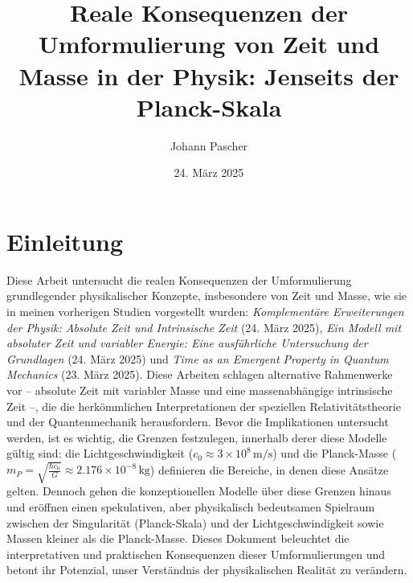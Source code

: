 \documentclass[a4paper,12pt]{article}
\begin{document}
	
	\title{Reale Konsequenzen der Umformulierung von Zeit und Masse in der Physik: Jenseits der Planck-Skala}
	\author{Johann Pascher}
	\date{24. März 2025}
	\maketitle
	
	\tableofcontents %
	\newpage %
	
	\section{Einleitung}
	Diese Arbeit untersucht die realen Konsequenzen der Umformulierung grundlegender physikalischer Konzepte, insbesondere von Zeit und Masse, wie sie in meinen vorherigen Studien vorgestellt wurden: \textit{Komplementäre Erweiterungen der Physik: Absolute Zeit und Intrinsische Zeit} (24. März 2025), \textit{Ein Modell mit absoluter Zeit und variabler Energie: Eine ausführliche Untersuchung der Grundlagen} (24. März 2025) und \textit{Time as an Emergent Property in Quantum Mechanics} (23. März 2025). Diese Arbeiten schlagen alternative Rahmenwerke vor – absolute Zeit mit variabler Masse und eine massenabhängige intrinsische Zeit –, die die herkömmlichen Interpretationen der speziellen Relativitätstheorie und der Quantenmechanik herausfordern. Bevor die Implikationen untersucht werden, ist es wichtig, die Grenzen festzulegen, innerhalb derer diese Modelle gültig sind: die Lichtgeschwindigkeit (\( c_0 \approx 3 \times 10^8 \, \text{m/s} \)) und die Planck-Masse (\( m_P = \sqrt{\frac{\hbar c_0}{G}} \approx 2.176 \times 10^{-8} \, \text{kg} \)) definieren die Bereiche, in denen diese Ansätze gelten. Dennoch gehen die konzeptionellen Modelle über diese Grenzen hinaus und eröffnen einen spekulativen, aber physikalisch bedeutsamen Spielraum zwischen der Singularität (Planck-Skala) und der Lichtgeschwindigkeit sowie Massen kleiner als die Planck-Masse. Dieses Dokument beleuchtet die interpretativen und praktischen Konsequenzen dieser Umformulierungen und betont ihr Potenzial, unser Verständnis der physikalischen Realität zu verändern.
	
\end{document}
